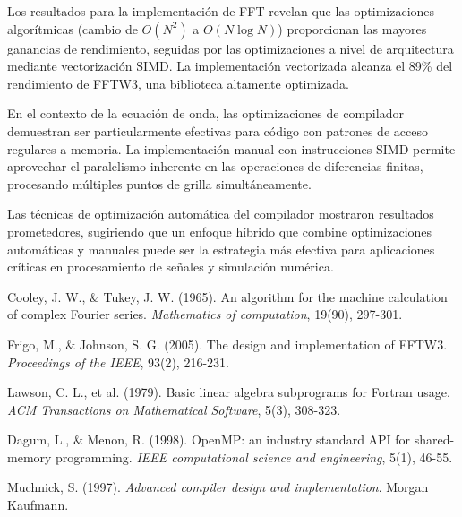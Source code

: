 \documentclass[a4paper]{article}
\begin{document}
Los resultados para la implementación de FFT revelan que las optimizaciones algorítmicas (cambio de $O(N^2)$ a $O(N \log N)$) proporcionan las mayores ganancias de rendimiento, seguidas por las optimizaciones a nivel de arquitectura mediante vectorización SIMD. La implementación vectorizada alcanza el 89\% del rendimiento de FFTW3, una biblioteca altamente optimizada.

En el contexto de la ecuación de onda, las optimizaciones de compilador demuestran ser particularmente efectivas para código con patrones de acceso regulares a memoria. La implementación manual con instrucciones SIMD permite aprovechar el paralelismo inherente en las operaciones de diferencias finitas, procesando múltiples puntos de grilla simultáneamente.

Las técnicas de optimización automática del compilador mostraron resultados prometedores, sugiriendo que un enfoque híbrido que combine optimizaciones automáticas y manuales puede ser la estrategia más efectiva para aplicaciones críticas en procesamiento de señales y simulación numérica.

\begin{thebibliography}{9}
Cooley, J. W., \& Tukey, J. W. (1965). An algorithm for the machine calculation of complex Fourier series. \textit{Mathematics of computation}, 19(90), 297-301.

Frigo, M., \& Johnson, S. G. (2005). The design and implementation of FFTW3. \textit{Proceedings of the IEEE}, 93(2), 216-231.

Lawson, C. L., et al. (1979). Basic linear algebra subprograms for Fortran usage. \textit{ACM Transactions on Mathematical Software}, 5(3), 308-323.

Dagum, L., \& Menon, R. (1998). OpenMP: an industry standard API for shared-memory programming. \textit{IEEE computational science and engineering}, 5(1), 46-55.

Muchnick, S. (1997). \textit{Advanced compiler design and implementation}. Morgan Kaufmann.
\end{thebibliography}
\end{document}
